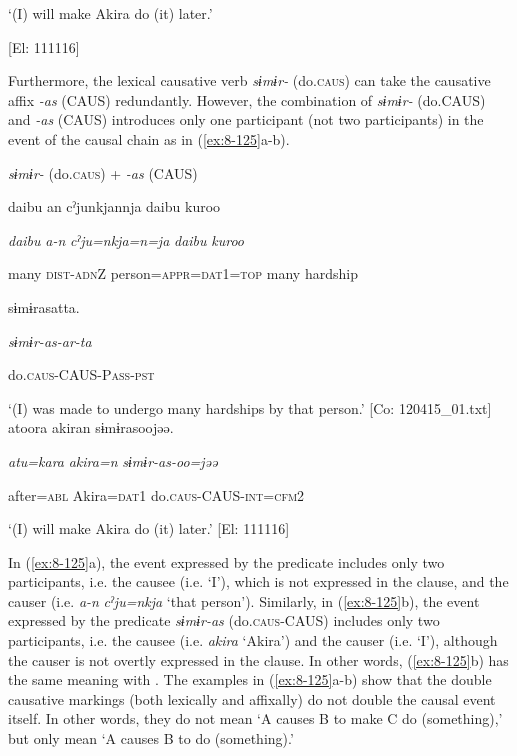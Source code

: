    ‘(I) will make Akira do (it) later.’

    [El: 111116]

Furthermore, the lexical causative verb \textit{sɨmɨr-} (do.\textsc{caus}) can take the causative affix \textit{{}-as} (CAUS) redundantly. However, the combination of \textit{sɨmɨr-} (do.CAUS) and \textit{{}-as} (CAUS) introduces only one participant (not two participants) in the event of the causal chain as in (\ref{ex:8-125}a-b).

\ea\label{ex:8-125}
  \textit{sɨmɨr-} (do.\textsc{caus}) + \textit{{}-as} (CAUS)

\ea {\TM}
\glll  {\textbar}daibu{\textbar}  an  cˀjunkjannja  {\textbar}daibu  kuroo{\textbar}

      \textit{daibu}  \textit{a-n}  \textit{cˀju=nkja=n=ja}  \textit{daibu}  \textit{kuroo}

      many  \textsc{dist}-\textsc{adn}Z  person=\textsc{appr}=\textsc{dat}1=\textsc{top}  many  hardship

      sɨmɨrasatta.

      \textit{sɨmɨr-as-ar-ta}

      do.\textsc{caus}-CAUS-P\textsc{ass}-\textsc{pst}

\glt ‘(I) was made to undergo many hardships by that person.’ [Co: 120415\_01.txt]
\ex {\TM}
\glll  atoora  akiran  sɨmɨrasoojəə.

      \textit{atu=kara}  \textit{akira=n}  \textit{sɨmɨr-as-oo=jəə}

      after=\textsc{abl}  Akira=\textsc{dat}1  do.\textsc{caus}-CAUS-\textsc{int}=\textsc{cfm}2

\glt ‘(I) will make Akira do (it) later.’ [El: 111116]

In (\ref{ex:8-125}a), the event expressed by the predicate includes only two participants, i.e. the causee (i.e. ‘I’), which is not expressed in the clause, and the causer (i.e. \textit{a-n} \textit{cˀju=nkja} ‘that person’). Similarly, in (\ref{ex:8-125}b), the event expressed by the predicate \textit{sɨmɨr-as} (do.\textsc{caus}-CAUS) includes only two participants, i.e. the causee (i.e. \textit{akira} ‘Akira’) and the causer (i.e. ‘I’), although the causer is not overtly expressed in the clause. In other words, (\ref{ex:8-125}b) has the same meaning with . The examples in (\ref{ex:8-125}a-b) show that the double causative markings (both lexically and affixally) do not double the causal event itself. In other words, they do not mean ‘A causes B to make C do (something),’ but only mean ‘A causes B to do (something).’

